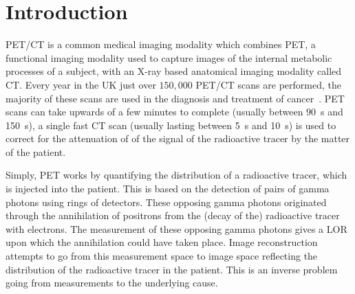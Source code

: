 \chapter{Introduction} \label{sec:introduction}
    
    
        \gls{PET}/\gls{CT} is a common medical imaging modality which combines \gls{PET}, a functional imaging modality used to capture images of the internal metabolic processes of a subject, with an X-ray based anatomical imaging modality called \gls{CT}. Every year in the UK just over $150,000$ \gls{PET}/\gls{CT} scans are performed, the majority of these scans are used in the diagnosis and treatment of cancer~. \gls{PET} scans can take upwards of a few minutes to complete (usually between \SI{90}{\second} and \SI{150}{\second}), a single fast \gls{CT} scan (usually lasting between \SI{5}{\second} and \SI{10}{\second}) is used to correct for the attenuation of of the signal of the radioactive tracer by the matter of the patient.
    
        Simply, \gls{PET} works by quantifying the distribution of a radioactive tracer, which is injected into the patient. This is based on the detection of pairs of gamma photons using rings of detectors. These opposing gamma photons originated through the annihilation of positrons from the (decay of the) radioactive tracer with electrons. The measurement of these opposing gamma photons gives a \gls{LOR} upon which the annihilation could have taken place. Image reconstruction attempts to go from this measurement space to image space reflecting the distribution of the radioactive tracer in the patient. This is an inverse problem going from measurements to the underlying cause.
            
